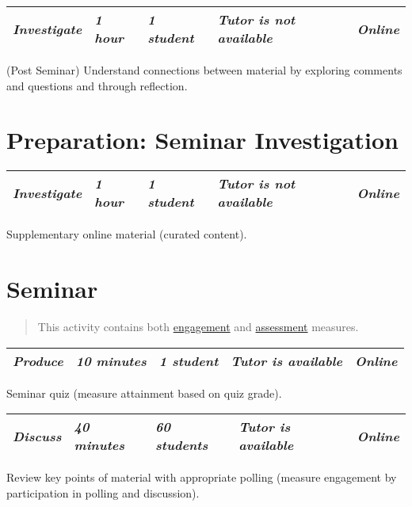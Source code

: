 \documentclass[
]{book}
\begin{document}
\begin{longtable}[]{@{}lllll@{}}
\toprule
\endhead
\emph{Investigate} & \emph{1 hour} & \emph{1 student} & \emph{Tutor is not available} & \emph{Online}\tabularnewline
\bottomrule
\end{longtable}

(Post Seminar) Understand connections between material by exploring
comments and questions and through reflection.

\hypertarget{preparation-seminar-investigation}{%
\section{Preparation: Seminar Investigation}\label{preparation-seminar-investigation}}

\begin{longtable}[]{@{}lllll@{}}
\toprule
\endhead
\emph{Investigate} & \emph{1 hour} & \emph{1 student} & \emph{Tutor is not available} & \emph{Online}\tabularnewline
\bottomrule
\end{longtable}

Supplementary online material (curated content).

\hypertarget{seminar}{%
\section{Seminar}\label{seminar}}

\begin{quote}
This activity contains both \protect\hyperlink{engagement}{engagement} and \protect\hyperlink{assessment}{assessment} measures.
\end{quote}

\begin{longtable}[]{@{}lllll@{}}
\toprule
\endhead
\emph{Produce} & \emph{10 minutes} & \emph{1 student} & \emph{Tutor is available} & \emph{Online}\tabularnewline
\bottomrule
\end{longtable}

Seminar quiz (measure attainment based on quiz grade).

\begin{longtable}[]{@{}lllll@{}}
\toprule
\endhead
\emph{Discuss} & \emph{40 minutes} & \emph{60 students} & \emph{Tutor is available} & \emph{Online}\tabularnewline
\bottomrule
\end{longtable}

Review key points of material with appropriate polling (measure
engagement by participation in polling and discussion).
\end{document}
